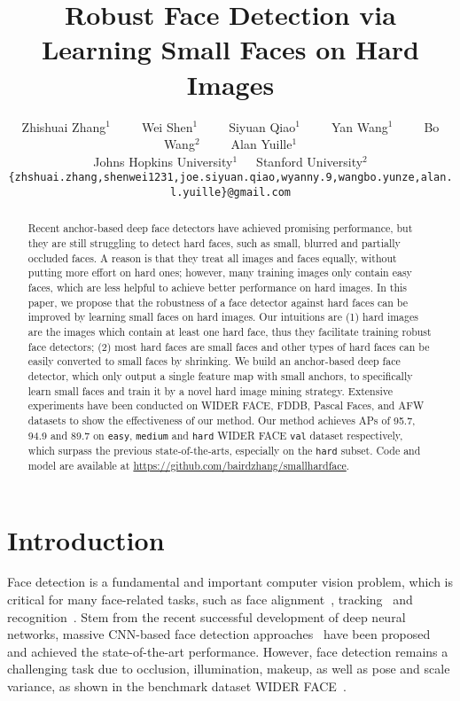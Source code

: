 \documentclass[10pt,twocolumn,letterpaper]{article}
\begin{document}
\title{Robust Face Detection via Learning Small Faces on Hard Images}

\author{Zhishuai Zhang$^{1}$~~~~~Wei Shen$^{1}$~~~~~Siyuan Qiao$^{1}$~~~~~Yan Wang$^{1}$~~~~~Bo Wang$^{2}$~~~~~Alan Yuille$^{1}$\\
Johns Hopkins University$^{1}$~~~Stanford University$^{2}$\\
{\tt\small \{zhshuai.zhang,shenwei1231,joe.siyuan.qiao,wyanny.9,wangbo.yunze,alan.l.yuille\}@gmail.com}
}

\maketitle


\begin{abstract}
Recent anchor-based deep face detectors have achieved promising performance, but they are still struggling to detect hard faces, such as small, blurred and partially occluded faces. A reason is that they treat all images and faces equally, without putting more effort on hard ones; however, many training images only contain easy faces, which are less helpful to achieve better performance on hard images. In this paper, we propose that the robustness of a face detector against hard faces can be improved by learning small faces on hard images. Our intuitions are (1) hard images are the images which contain at least one hard face, thus they facilitate training robust face detectors; (2) most hard faces are small faces and other types of hard faces can be easily converted to small faces by shrinking.
We build an anchor-based deep face detector, which only output a single feature map with small anchors, to specifically learn small faces and train it by a novel hard image mining strategy.
Extensive experiments have been conducted on WIDER FACE, FDDB, Pascal Faces, and AFW datasets
to show the effectiveness of our method.
Our method achieves APs of 95.7, 94.9 and 89.7 on \texttt{easy},
\texttt{medium} and \texttt{hard} WIDER FACE \texttt{val}
dataset respectively,
which surpass the previous state-of-the-arts, especially on the \texttt{hard} subset.
Code and model are available at \href{https://github.com/bairdzhang/smallhardface}{https://github.com/bairdzhang/smallhardface}.
\end{abstract}

\section{Introduction}
Face detection is a fundamental and important computer vision problem, which is critical for many face-related tasks, such as face alignment~\cite{cao2014face,xiong2013supervised}, tracking~\cite{kim2008face} and recognition~\cite{parkhi2015deep,schroff2015facenet}. Stem from the recent successful development of deep neural networks, massive CNN-based face detection approaches~\cite{hu2017finding,najibi2017ssh,Tang_2018_ECCV,zhang2017s,zhu2018seeing} have been
proposed and achieved the state-of-the-art performance. However, face detection remains a challenging task due to occlusion, illumination, makeup, as well as pose and scale variance, as shown in the benchmark dataset WIDER FACE~\cite{yang2016wider}.
\end{document}
